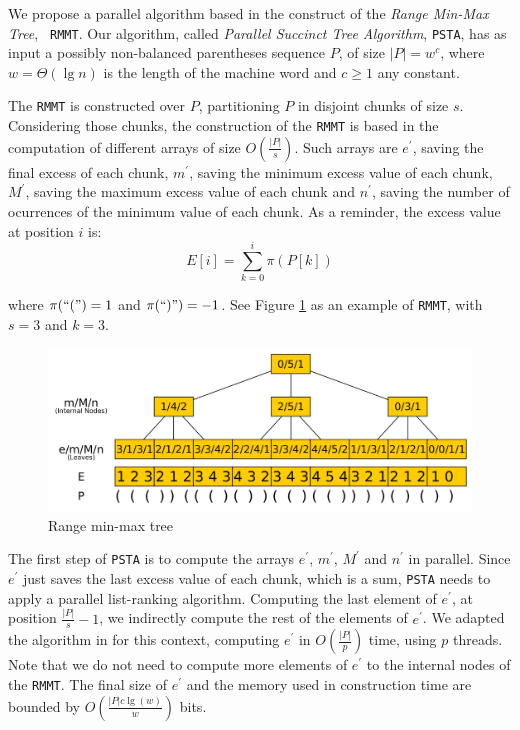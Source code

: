 We propose a parallel algorithm based in the construct of the
\emph{Range Min-Max Tree}, {\tt
  RMMT}\cite{Navarro:2014:FFS:2620785.2601073}. Our algorithm, called
\emph{Parallel Succinct Tree Algorithm}, {\tt PSTA}, has as input a
possibly non-balanced parentheses sequence $P$, of size
$|P| = w^{c}$, where $w=\Theta(\lg n)$ is the length of the machine word and
$c\geq 1$ any constant.

The {\tt RMMT} is constructed over $P$, partitioning $P$ in disjoint
chunks of size $s$. Considering those chunks, the construction of the
{\tt RMMT} is based in the computation of different arrays of size
$O(\frac{|P|}{s})$. Such arrays are $e^{\prime}$, saving the final
excess of each chunk, $m^{\prime}$, saving the minimum excess value of
each chunk, $M^{\prime}$, saving the maximum excess value of each
chunk and $n^{\prime}$, saving the number of ocurrences of the minimum
value of each chunk. As a reminder, the excess value at position $i$
is:
\begin{equation}
  \displaystyle E[i] = \sum_{k=0}^{i} \pi(P[k])
  \label{eq:excess}
\end{equation}

where $\pi(``(") = 1$ and $\pi(``)") = -1$. See Figure
\ref{fig:RangeMinMaxTree} as an example of {\tt RMMT}, with $s=3$ and
$k=3$.

\begin{figure}[ht]
  \centering
  \includegraphics[scale=0.18]{./images/Range-min-max-tree.png}
  \caption{Range min-max tree}
  \label{fig:RangeMinMaxTree} 
\end{figure}

The first step of {\tt PSTA} is to compute the arrays $e^{\prime}$,
$m^{\prime}$, $M^{\prime}$ and $n^{\prime}$ in parallel. Since
$e^{\prime}$ just saves the last excess value of each chunk, which is
a sum, {\tt PSTA} needs to apply a parallel list-ranking
algorithm. Computing the last element of $e^{\prime}$, at position
$\frac{|P|}{s}-1$, we indirectly compute the rest of the elements of
$e^{\prime}$. We adapted the algorithm in \cite{Helman2001265} for
this context, computing $e^{\prime}$ in $O(\frac{|P|}{p})$ time, using
$p$ threads. Note that we do not need to compute more elements of
$e^{\prime}$ to the internal nodes of the {\tt RMMT}. The final size
of $e^{\prime}$ and the memory used in construction time are bounded
by $O(\frac{|P|c\lg(w)}{w})$ bits.

